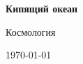 \begin{titlepage}
  \centering
  \vspace*{2cm}
  {\LARGE\bfseries Кипящий океан\par}
  \vspace{0.8cm}
  {\Large Космология\par}
  \vfill
  {\large \today\par}
\end{titlepage}
\clearpage

\clearpage
\tableofcontents
\clearpage
